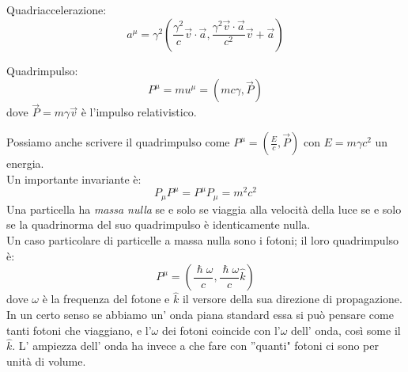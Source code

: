 \documentclass[a4paper,10pt,oneside]{math_article}
\begin{document}
			Quadriaccelerazione:
			\begin{equation}
				a^\mu = \gamma^2\left( \frac{\gamma^2}c \vec v \cdot \vec a, \frac{\gamma^2\vec v \cdot \vec a}{c^2} \vec v + \vec a\right)
			\end{equation}
						
			Quadrimpulso:
			\begin{equation}
				P^\mu = mu^\mu = (mc\gamma, \vec P)
			\end{equation}
			dove $\vec P = m\gamma \vec v$ è l'impulso relativistico.
			
			Possiamo anche scrivere il quadrimpulso come $P^\mu = (\frac Ec, \vec P)$ con $E=m\gamma c^2$ un energia.\\
			Un importante invariante è:
			\[
			P_\mu P^\mu=P^\mu P_\mu=m^2 c^2
			\]
			Una particella ha {\it massa nulla} se e solo se viaggia alla velocità della luce se e solo se la quadrinorma del suo quadrimpulso è identicamente nulla.\\
			Un caso particolare di particelle a massa nulla sono i fotoni; il loro quadrimpulso è:
			\[	
			P^\mu=\left(\frac{\hslash \omega}{c},\frac{\hslash \omega}{c}\hat k\right)
			\]
			dove $\omega$ è la frequenza del fotone e $\hat k$ il versore della sua direzione di propagazione.
			In un certo senso se abbiamo un' onda piana standard essa si può pensare come tanti fotoni che viaggiano, e l'$\omega$ dei fotoni coincide con l'$\omega$ dell' onda, così some il $\hat k$. L' ampiezza dell' onda ha invece a che fare con ''quanti" fotoni ci sono per unità di volume.
\end{document}
